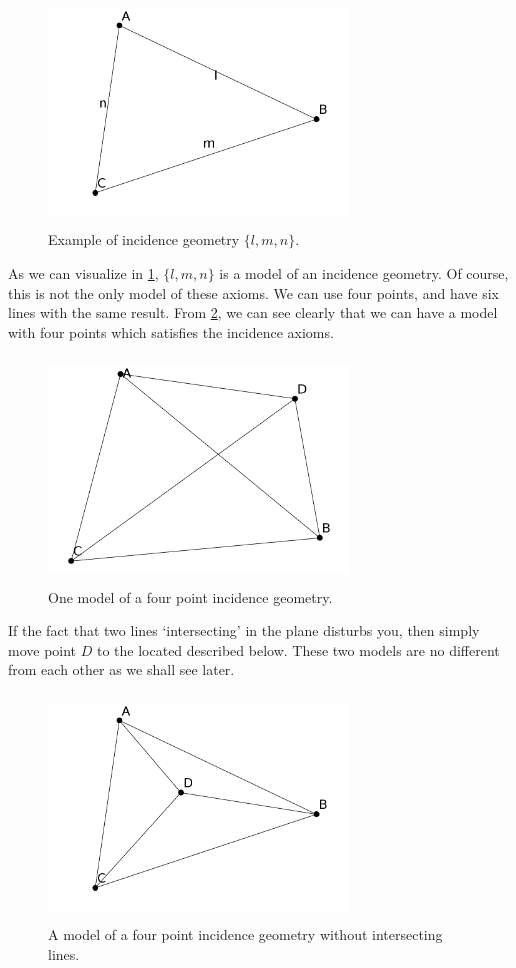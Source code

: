 \documentclass[12pt]{book}
\begin{document}
\vfill
\pagebreak

\begin{figure}[H]
	\centering
	\includegraphics[width=8cm, height=6cm]{images/3pointincidence}
	\caption{Example of incidence geometry $\{l,m,n\}$.}
	\label{fig:incidence1}
\end{figure}

As we can visualize in \ref{fig:incidence1}, $\{l,m,n\}$ is a model of an incidence geometry. Of course, this is not the only model of these axioms. We can use four points, and have six lines with the same result. From \ref{fig:incidence2}, we can see clearly that we can have a model with four points which satisfies the incidence axioms. 

\begin{figure}[H]
	\centering
	\includegraphics[width=8cm, height=6cm]{images/4pointincidence-a}
	\caption{One model of a four point incidence geometry.}
	\label{fig:incidence2}
\end{figure}

If the fact that two lines `intersecting' in the plane disturbs you, then simply move point $D$ to the located described below. These two models are no different from each other as we shall see later.

\begin{figure}[H]
	\centering
	\includegraphics[width=8cm, height=6cm]{images/4pointincidence-a-2}
	\caption{A model of a four point incidence geometry without intersecting lines.}
\end{figure}
\end{document}
